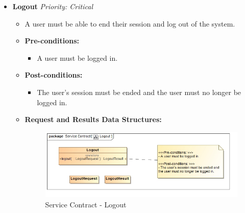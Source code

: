 \documentclass{article}
\begin{document}
\begin{itemize}
					\cleardoublepage
					\item \textbf{Logout} \hfill \textit{Priority: Critical}
					\begin{itemize}
						\item A user must be able to end their session and log out of the system.
						\item \textbf{Pre-conditions:}
						\begin{itemize}
							\item A user must be logged in.
						\end{itemize}
						\item \textbf{Post-conditions:}
						\begin{itemize}
							\item The user's session must be ended and the user must no longer be logged in.
						\end{itemize}
						\item \textbf{Request and Results Data Structures:}
						\begin{figure}[H]
							\includegraphics[width=\linewidth]{../Diagrams/ServiceContracts/User subsystem/Logout.jpg}
							\caption{Service Contract - Logout}
						\end{figure}
					\end{itemize}
					

\end{itemize}
\end{document}
